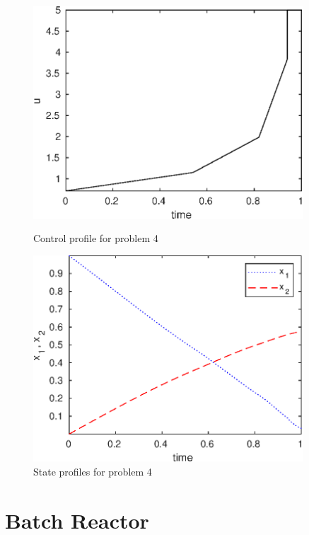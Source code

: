 \begin{figure}[htb]
\begin{minipage}[t]{0.5\linewidth}
\centering
\includegraphics[width=0.9\textwidth]{examples/problem4/graphs/u_624a.eps}
\caption[Problem 4: Control profile]{Control profile for problem 4}
\label{fig:prob4_u}  
\end{minipage}
\begin{minipage}[t]{0.5\linewidth}
\centering
\includegraphics[width=0.9\textwidth]{examples/problem4/graphs/x12_624a.eps}
\caption[Problem 4: State profiles]{State profiles for problem 4}
\label{fig:prob4_x} 
\end{minipage}
\end{figure}
 
\section{Batch Reactor}
\label{sec:prob5}

